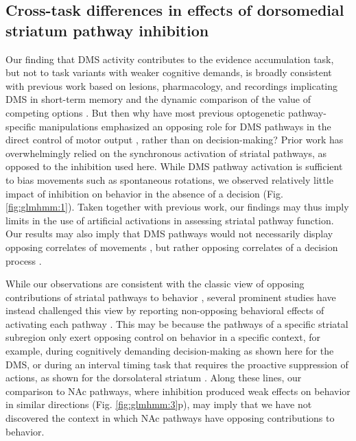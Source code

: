 \subsection{Cross-task differences in effects of dorsomedial striatum pathway inhibition}
\label{sec:glmhmm:discussion-1}

Our finding that DMS activity contributes to the evidence accumulation task, but not to task variants with weaker cognitive demands, is broadly consistent with previous work based on lesions, pharmacology, and recordings implicating DMS in short-term memory and the dynamic comparison of the value of competing options \cite{balleine_role_2007, yartsev_causal_2018, lau_value_2008, ding_separate_2012, akhlaghpour_dissociated_2016, donahue_distinct_2018, shin_differential_2018, delevich_choice_2020, frank_mechanisms_2012}. But then why have most previous optogenetic pathway-specific manipulations emphasized an opposing role for DMS pathways in the direct control of motor output \cite{kravitz_regulation_2010, roseberry_cell-type-specific_2016, bartholomew_striatonigral_2016, yttri_opponent_2016, lee_anatomically_2020, lee_activation_2016}, rather than on decision-making? Prior work has overwhelmingly relied on the synchronous activation of striatal pathways, as opposed to the inhibition used here. While DMS pathway activation is sufficient to bias movements such as spontaneous rotations, we observed relatively little impact of inhibition on behavior in the absence of a decision (Fig. \ref{fig:glmhmm:1}). Taken together with previous work, our findings may thus imply limits in the use of artificial activations in assessing striatal pathway function. Our results may also imply that DMS pathways would not necessarily display opposing correlates of movements \cite{parker_diametric_2018, london_coordinated_2018, cui_concurrent_2013, barbera_spatially_2016, sippy_cell-type-specific_2015, jin_basal_2014}, but rather opposing correlates of a decision process \cite{cui_asymmetrical_2021, tang_opposing_2021, yartsev_causal_2018, ding_separate_2012, donahue_distinct_2018, frank_mechanisms_2012}.

While our observations are consistent with the classic view of opposing contributions of striatal pathways to behavior \cite{alexander_functional_1990}, several prominent studies have instead challenged this view by reporting non-opposing behavioral effects of activating each pathway \cite{soares-cunha_activation_2016, cole_optogenetic_2018, vicente_direct_2016, tecuapetla_complementary_2016, geddes_optogenetic_2018, wang_activation_2018, peak_striatal_2020}. This may be because the pathways of a specific striatal subregion only exert opposing control on behavior in a specific context, for example, during cognitively demanding decision-making as shown here for the DMS, or during an interval timing task that requires the proactive suppression of actions, as shown for the dorsolateral striatum \cite{cruz_striatal_2020}. Along these lines, our comparison to NAc pathways, where inhibition produced weak effects on behavior in similar directions (Fig. \ref{fig:glmhmm:3}p), may imply that we have not discovered the context in which NAc pathways have opposing contributions to behavior.

